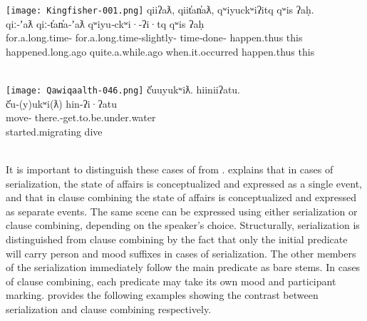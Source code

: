 \begin{exe}
  \ex\label{ex:3.11}
  \begin{xlist}

    \renewcommand{\eachwordfive}{\rule[-10pt]{0pt}{0pt}\rmfamily}

    \ex\label{ex:3.11a}
    \texttt{[image: Kingfisher-001.png]}
    \glllll qiiʔaƛ,                  qiit̓an̓aƛ,                         qʷiyuckʷiʔitq        qʷis        ʔaḥ.\\
            qiː‑ʼaƛ                  qiː‑t̓an̓a‑ʼaƛ                      qʷiyu‑ckʷi·‑ʔi·tq    qʷis        ʔaḥ\\
            for.a.long.time‑ for.a.long.time‑slightly‑ time‑done‑ happen.thus this\\
            happened.long.ago        quite.a.while.ago                 when.it.occurred     happen.thus this\\
                                                                     \\

    \ex\label{ex:3.11b}
    \texttt{[image: Qawiqaalth-046.png]}
    \glllll č̓uuyukʷiƛ.        hiiniiʔatu.\\
            č̓u‑(y)ukʷi(ƛ)     hin‑ʔi·ʔatu\\
            move‑   there.‑get.to.be.under.water\\
            started.migrating dive\\
                     \\

    \renewcommand{\eachwordfive}{\rmfamily}

  \end{xlist}
\end{exe}

It is important to distinguish these cases of  from . \textcite[98]{Nakayama2001} explains that in cases of serialization, the state of affairs is conceptualized and expressed as a single event, and that in clause combining the state of affairs is conceptualized and expressed as separate events. The same scene can be expressed using either serialization or clause combining, depending on the speaker's choice. Structurally, serialization is distinguished from clause combining by the fact that only the initial predicate will carry person and mood suffixes in cases of serialization. The other members of the serialization immediately follow the main predicate as bare stems. In cases of clause combining, each predicate may take its own mood and participant marking. \textcite[99]{Nakayama2001} provides the following examples showing the contrast between serialization and clause combining respectively.

